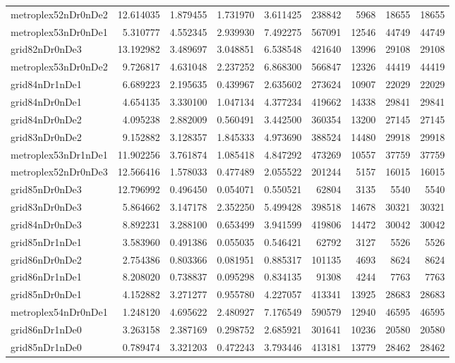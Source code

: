 \documentclass[../../../thesis.tex]{subfiles}
\begin{document}
\begin{longtable}{|l|r|r|r|r|r|r|r|r|}
metroplex52nDr0nDe2 & 12.614035 & 1.879455 & 1.731970 & 3.611425 & 238842 & 5968 & 18655 & 18655 \\
metroplex53nDr0nDe1 & 5.310777 & 4.552345 & 2.939930 & 7.492275 & 567091 & 12546 & 44749 & 44749 \\
grid82nDr0nDe3 & 13.192982 & 3.489697 & 3.048851 & 6.538548 & 421640 & 13996 & 29108 & 29108 \\
metroplex53nDr0nDe2 & 9.726817 & 4.631048 & 2.237252 & 6.868300 & 566847 & 12326 & 44419 & 44419 \\
grid84nDr1nDe1 & 6.689223 & 2.195635 & 0.439967 & 2.635602 & 273624 & 10907 & 22029 & 22029 \\
grid84nDr0nDe1 & 4.654135 & 3.330100 & 1.047134 & 4.377234 & 419662 & 14338 & 29841 & 29841 \\
grid84nDr0nDe2 & 4.095238 & 2.882009 & 0.560491 & 3.442500 & 360354 & 13200 & 27145 & 27145 \\
grid83nDr0nDe2 & 9.152882 & 3.128357 & 1.845333 & 4.973690 & 388524 & 14480 & 29918 & 29918 \\
metroplex53nDr1nDe1 & 11.902256 & 3.761874 & 1.085418 & 4.847292 & 473269 & 10557 & 37759 & 37759 \\
metroplex52nDr0nDe3 & 12.566416 & 1.578033 & 0.477489 & 2.055522 & 201244 & 5157 & 16015 & 16015 \\
grid85nDr0nDe3 & 12.796992 & 0.496450 & 0.054071 & 0.550521 & 62804 & 3135 & 5540 & 5540 \\
grid83nDr0nDe3 & 5.864662 & 3.147178 & 2.352250 & 5.499428 & 398518 & 14678 & 30321 & 30321 \\
grid84nDr0nDe3 & 8.892231 & 3.288100 & 0.653499 & 3.941599 & 419806 & 14472 & 30042 & 30042 \\
grid85nDr1nDe1 & 3.583960 & 0.491386 & 0.055035 & 0.546421 & 62792 & 3127 & 5526 & 5526 \\
grid86nDr0nDe2 & 2.754386 & 0.803366 & 0.081951 & 0.885317 & 101135 & 4693 & 8624 & 8624 \\
grid86nDr1nDe1 & 8.208020 & 0.738837 & 0.095298 & 0.834135 & 91308 & 4244 & 7763 & 7763 \\
grid85nDr0nDe1 & 4.152882 & 3.271277 & 0.955780 & 4.227057 & 413341 & 13925 & 28683 & 28683 \\
metroplex54nDr0nDe1 & 1.248120 & 4.695622 & 2.480927 & 7.176549 & 590579 & 12940 & 46595 & 46595 \\
grid86nDr1nDe0 & 3.263158 & 2.387169 & 0.298752 & 2.685921 & 301641 & 10236 & 20580 & 20580 \\
grid85nDr1nDe0 & 0.789474 & 3.321203 & 0.472243 & 3.793446 & 413181 & 13779 & 28462 & 28462 \\

\end{longtable}
\end{document}
